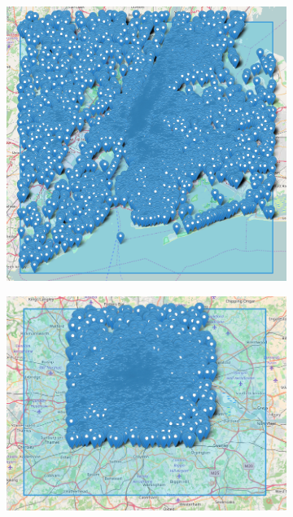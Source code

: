 \begin{figure}[!htbp]
	\centering
	\begin{subfigure}[htbp]{0.3\textwidth}
		\centering
		\includegraphics[width=1\linewidth]{figures/nyc_markers.png}
		\caption{}
		\label{subfig:nyc_markers}
	\end{subfigure}
	\quad
	\begin{subfigure}[htbp]{0.3\textwidth}
		\centering
		\includegraphics[width=1\linewidth]{figures/london_markers.png}
		\caption{}
		\label{subfig:london_markers}

\end{subfigure}
\end{figure}
